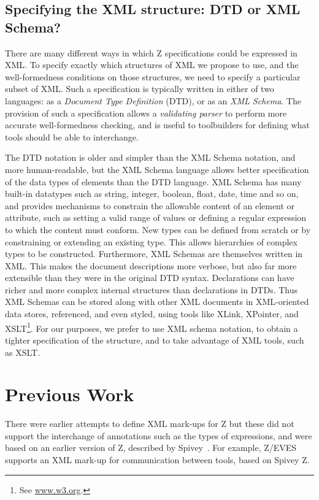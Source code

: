 \documentclass{llncs}  %
\begin{document}
\subsection{Specifying the XML structure: DTD or XML Schema?}

There are many different ways in which Z specifications could be
expressed in XML.  
To specify exactly which structures of XML we propose to
use, and the well-formedness conditions on those structures, we need to
specify a particular subset of XML.
Such a specification is typically written in either of two languages:
as a \textit{Document Type Definition} (DTD), or as an \textit{XML
  Schema}.  The provision of such a specification allows a
\textit{validating parser} to perform more accurate well-formedness
checking, and is useful to toolbuilders for defining what tools should be
able to interchange.

The DTD notation is older and simpler than the XML Schema notation, and
more human-readable, but the XML Schema language allows better
specification of the data types of elements than the DTD language.  XML
Schema has many built-in datatypes such as string, integer, boolean, float,
date, time and so on, and provides mechanisms to constrain the allowable
content of an element or attribute, such as setting a valid range of values
or defining a regular expression to which the content must conform.  New
types can be defined from scratch or by constraining or extending an
existing type.  This allows hierarchies of complex types to be constructed.
Furthermore, XML Schemas are themselves written in XML.  This makes the
document descriptions more verbose, but also far more extensible than they
were in the original DTD syntax. Declarations can have richer and more
complex internal structures than declarations in DTDs. Thus XML Schemas can
be stored along with other XML documents in XML-oriented data stores,
referenced, and even styled, using tools like XLink, XPointer, and
XSLT\footnote{See \url{www.w3.org}.}. For our purposes, we prefer to use XML
schema notation, to obtain a tighter specification of the structure, and to
take advantage of XML tools, such as XSLT.


\section{Previous Work}

There were earlier attempts to define XML mark-ups for Z
\cite{Wordsworth99,Dong01} but these did not support the interchange of
annotations such as the types of expressions, and were based on an earlier
version of Z, described by Spivey~\cite{spivey:z-notation2}. 
For example, Z/EVES~\cite{saaltink:zeves-system} supports an XML mark-up
for communication between tools, based on Spivey Z.
\end{document}
